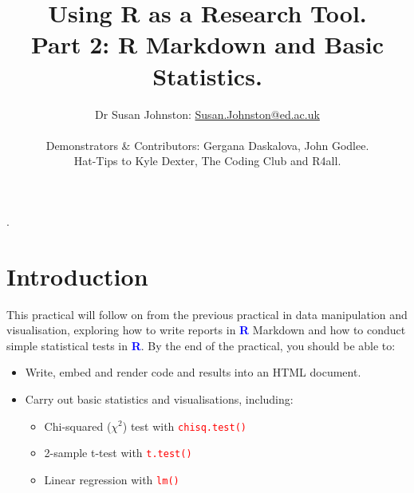 \documentclass[a4paper,12pt]{article}
\newcommand\boldblue[1]{\textcolor{blue}{\textbf{#1}}}
\newcommand\code[1]{\textcolor{red}{\texttt{#1}}}
\begin{document}





\title{Using R as a Research Tool.\\
Part 2: R Markdown and Basic Statistics.}
\author{Dr Susan Johnston: \href{mailto:Susan.Johnston@ed.ac.uk}{Susan.Johnston@ed.ac.uk}  \\ \\
Demonstrators \& Contributors: Gergana Daskalova, John Godlee. \\
Hat-Tips to Kyle Dexter, The Coding Club and R4all.}
\date{}






\maketitle


\vspace*{-2.5cm}.
\section {Introduction}

This practical will follow on from the previous practical in data manipulation and visualisation, exploring how to write reports in \boldblue{R} Markdown and how to conduct simple statistical tests in \boldblue{R}. By the end of the practical, you should be able to:

\begin{itemize}

\item Write, embed and render code and results into an HTML document.

\item Carry out basic statistics and visualisations, including:

\begin{itemize}

\item Chi-squared ($\chi^{2}$) test with \code{chisq.test()}
\item 2-sample t-test with \code{t.test()}
\item Linear regression with \code{lm()}


\end{itemize}

\end{itemize}
\end{document}
